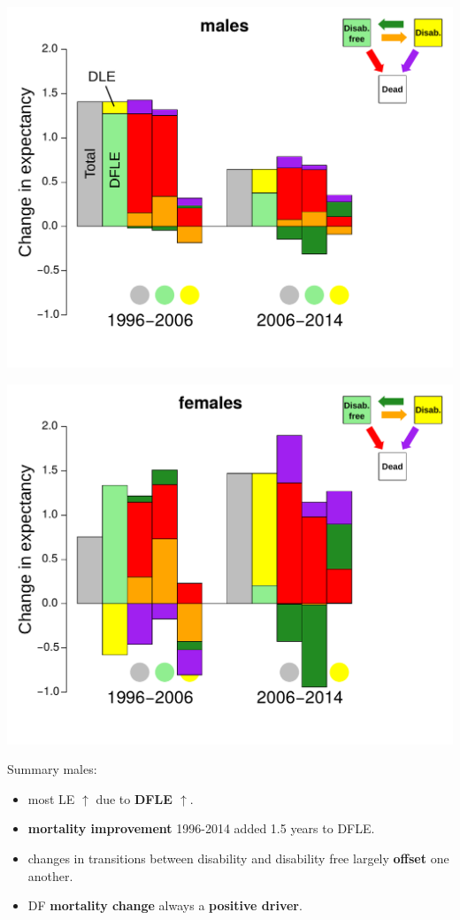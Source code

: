\documentclass[20pt,usenames,dvipsnames]{beamer}
\begin{document}
\begin{frame}[plain]
\includegraphics[height=\textheight, keepaspectratio]{Figures/MalesDecAllEdu5.pdf}
\end{frame}
\begin{frame}[plain]
\includegraphics[height=\textheight, keepaspectratio]{Figures/FemalesDecAllEdu1.pdf}
\end{frame}


\begin{frame}[plain]
\Large
\begin{center}
Summary males:
\begin{itemize}[<+->]
\item most LE $\uparrow$ due to \textbf{DFLE $\uparrow$}.
\item \textbf{mortality improvement} 1996-2014 added 1.5 years to DFLE.
\item changes in transitions between disability and disability free largely \textbf{offset} one another.
\item DF \textbf{mortality change} always a \textbf{positive driver}.
\end{itemize}
\end{center}
\end{frame}
\end{document}
